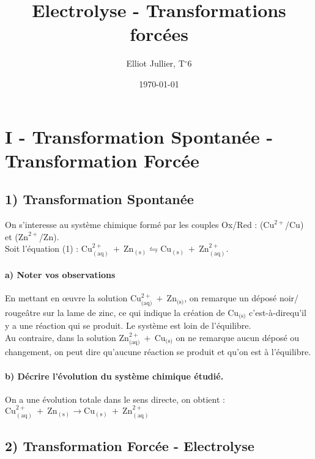 \documentclass[a4paper, 12pt]{scrartcl}
\newcommand{\cad}{c'est-à-dire}
\newcommand{\dg}{$^{\circ}$}
\begin{document}
    
\title{Electrolyse - Transformations forcées}
\date{\today}
\author{Elliot Jullier, T\dg 6}
\maketitle

\section*{I - Transformation Spontanée - Transformation Forcée}
\subsection*{1) Transformation Spontanée}

On s'interesse au système chimique formé par les couples Ox/Red : 
($\text{Cu}^{2+}$/Cu) et ($\text{Zn}^{2+}$/Zn). \\
Soit l'équation (1) : $\text{Cu}^{2+}_{(\text{aq})}\ +\ \text{Zn}_{(\text{s})} \leftrightharpoons \text{Cu}_{(\text{s})}\ +\ \text{Zn}^{2+}_{(\text{aq})}$.

\paragraph*{a) Noter vos observations \\[5mm]}

En mettant en œuvre la solution $\text{Cu}^{2+}_{\text{(aq)}}\ +\ \text{Zn}_{\text{(s)}}$, on remarque un déposé noir/ rougeâtre sur la lame de zinc, 
ce qui indique la création de $\text{Cu}_{\text{(s)}}$ \cad qu'il y a une réaction qui se produit. Le système est loin de l'équilibre.
\\[2mm]
Au contraire, dans la solution $\text{Zn}^{2+}_{\text{(aq)}}\ +\ \text{Cu}_{\text{(s)}}$ on ne remarque aucun déposé ou changement, 
on peut dire qu'aucune réaction se produit et qu'on est à l'équilibre.

\paragraph*{b) Décrire l'évolution du système chimique étudié.\\[5mm]}

On a une évolution totale dans le sens directe, on obtient :\\ 
$\text{Cu}^{2+}_{(\text{aq})}\ +\ \text{Zn}_{(\text{s})} \longrightarrow \text{Cu}_{(\text{s})}\ +\ \text{Zn}^{2+}_{(\text{aq})}$

\subsection*{2) Transformation Forcée - Electrolyse}
\end{document}
